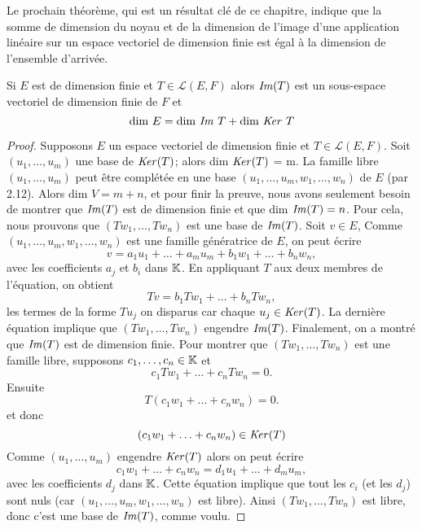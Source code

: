 \documentclass[12pt]{book}
\begin{document}
Le prochain théorème, qui est un résultat clé de ce chapitre, indique que la somme de dimension du noyau et de la dimension de l'image d'une application linéaire sur un espace vectoriel de dimension finie est égal à la dimension de l'ensemble d'arrivée.

\begin{thm}
Si $E$ est de dimension finie et $T\in \mathcal{L}(E,F)$ alors $\textrm{\textit{Im}}(T)$ est un sous-espace vectoriel de dimension finie de $F$ et 
\begin{equation*}
    \textrm{dim }E = \textrm{dim \textit{Im} }T + \textrm{dim \textit{Ker} }T
\end{equation*}
\begin{proof}
Supposons $E$ un espace vectoriel de dimension finie et $T \in \mathcal{L}(E,F)$. Soit $(u_1,\ldots,u_m)$ une base de $\textrm{\textit{Ker}}(T)$; alors dim $\textrm{\textit{Ker}}(T)$ = m. La famille libre $(u_1,\ldots,u_m)$ peut être complétée en une base $(u_1,\ldots,u_m,w_1,\ldots,w_n)$ de $E$ (par 2.12). Alors dim $V=m+n$, et pour finir la preuve, nous avons seulement besoin de montrer que $\textrm{\textit{Im}}(T)$ est de dimension finie et que dim $\textrm{\textit{Im}}(T) = n$. Pour cela, nous prouvons que $(Tw_1,\ldots,Tw_n)$ est une base de $\textrm{\textit{Im}}(T)$.
Soit $v\in E$, Comme $(u_1,\ldots,u_m,w_1,\ldots,w_n)$ est une famille génératrice de $E$, on peut écrire 
\begin{equation*}
    v = a_1u_1 + \ldots + a_mu_m + b_1w_1 + \ldots + b_nw_n,
\end{equation*}
avec les coefficients $a_j$ et $b_i$ dans $\mathbb{K}$. En appliquant $T$ aux deux membres de l'équation, on obtient 
\begin{equation*}
     Tv = b_1Tw_1 + \ldots + b_nTw_n,
\end{equation*}
les termes de la forme $Tu_j$ on disparus car chaque $u_j\in \textrm{\textit{Ker}}(T)$. La dernière équation implique que $(Tw_1,\ldots,Tw_n)$ engendre $\textrm{\textit{Im}}(T)$. Finalement, on a montré que $\textrm{\textit{Im}}(T)$ est de dimension finie. 
Pour montrer que $(Tw_1,\ldots,Tw_n)$ est une famille libre, supposons $c_1,\ldots,c_n\in\mathbb{K}$ et 
\begin{equation*}
    c_1Tw_1 + \ldots + c_nTw_n = 0.
\end{equation*}
Ensuite
\begin{equation*}
    T(c_1w_1 + \ldots + c_nw_n)= 0.
\end{equation*}
et donc 
\begin{equation*}
    (c_1w_1 + \ldots + c_nw_n)\in\textrm{\textit{Ker}}(T)
\end{equation*}
Comme $(u_1,\ldots,u_m)$ engendre $\textrm{\textit{Ker}}(T)$ alors on peut écrire 
\begin{equation*}
    c_1w_1 + \ldots + c_nw_n = d_1u_1 + \ldots + d_mu_m,
\end{equation*}
avec les coefficients $d_j$ dans $\mathbb{K}$. Cette équation implique que tout les $c_i$ (et les $d_j$) sont nuls (car $(u_1,\ldots,u_m,w_1,\ldots,w_n)$ est libre). Ainsi $(Tw_1,\ldots,Tw_n)$ est libre, donc c'est une base de  $\textrm{\textit{Im}}(T)$, comme voulu.
\end{proof}
\end{thm}
\end{document}
